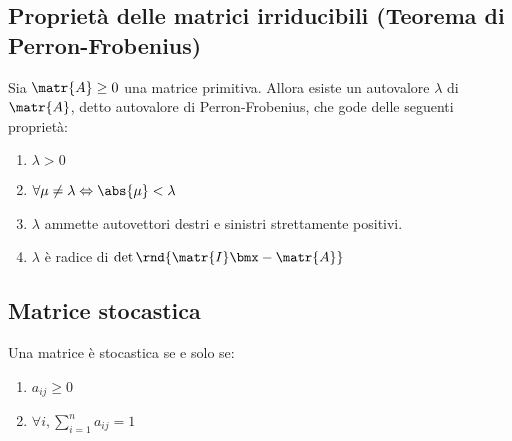 \documentclass[\main/main.tex]{subfiles}
\begin{document}
\subsection{Proprietà delle matrici irriducibili (Teorema di Perron-Frobenius)}

\begin{theorem}
  Sia \(\matr{A} \geq 0\) una matrice primitiva. Allora esiste un autovalore \(\lambda \) di \(\matr{A}\), detto autovalore di Perron-Frobenius, che gode delle seguenti proprietà:
  \begin{enumerate}
    \item \(\lambda > 0\)
    \item \(\forall \mu \neq \lambda \Leftrightarrow \abs{\mu} < \lambda \)
    \item \(\lambda \) ammette autovettori destri e sinistri strettamente positivi.
    \item \(\lambda \) è radice di \(\det\rnd{\matr{I}\bmx - \matr{A}}\)
  \end{enumerate}
\end{theorem}

\subsection{Matrice stocastica}
Una matrice è stocastica se e solo se:
\begin{enumerate}
  \item \(a_{ij} \geq 0\)
  \item \(\forall i, \sum_{i=1}^n a_{ij} = 1\)
\end{enumerate}
\end{document}
